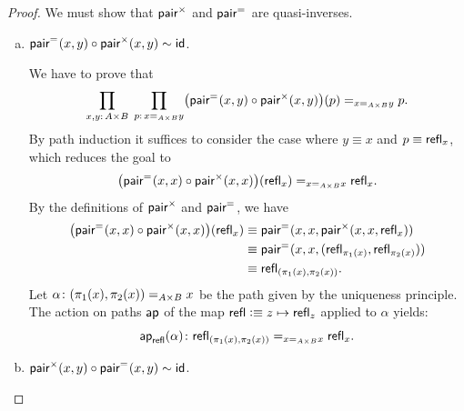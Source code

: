 \begin{proof}
    We must show that $\mathsf{pair}^\times$ and $\mathsf{pair}^{\mathrel{=_{}}}$ are quasi-inverses.
    \begin{enumerate}[a),font=\upshape]
        \item $\mathsf{pair}^{\mathrel{=_{}}}(x,y)\circ\mathsf{pair}^\times(x,y)\sim\mathsf{id}$.
         
        We have to prove that
        \[
            \prod_{x,y\colon A\times B}\;\prod_{p\colon x\eq{A\times B}y}
                \bigl(\fun{pair}^{\eq{}}(x,y)\circ\fun{pair}^\times(x,y)\bigr)(p)\eq{x\eq{A\times B}y}p.
        \]
        By path induction it suffices to consider the case where $y\equiv x$ and $p\equiv\mathsf{refl}_x$, which reduces the goal to
        \[
            \bigl(\mathsf{pair}^{\mathrel{=_{}}}(x,x)\circ\mathsf{pair}^\times(x,x)\bigr)(\mathsf{refl}_x)
                \mathrel{=_{x\mathrel{=_{A\times B}}x}}\mathsf{refl}_x.
        \]
        By the definitions of $\mathsf{pair}^\times$ and $\mathsf{pair}^{\mathrel{=_{}}}$, we have
        \begin{align*}
            \bigl(\mathsf{pair}^{\mathrel{=_{}}}(x,x)\circ\mathsf{pair}^\times(x,x)\bigr)(\mathsf{refl}_x)
                &\equiv\mathsf{pair}^{\mathrel{=_{}}}(x,x,\mathsf{pair}^\times(x,x,\mathsf{refl}_x))\\
                &\equiv\mathsf{pair}^{\mathrel{=_{}}}(x,x,
                    (\mathsf{refl}_{\pi_1(x)}
                    ,\mathsf{refl}_{\pi_2(x)}))\\
                &\equiv \mathsf{refl}_{(\pi_1(x),\pi_2(x))}.
        \end{align*}
        Let $\alpha\colon(\pi_1(x),\pi_2(x))\eq{A\times B}x$ be the path given by the uniqueness principle. The action on paths $\mathsf{ap}$ of the map $\mathsf{refl}\mathrel{\vcentcolon}\equiv z\mapsto\mathsf{refl}_z$ applied to $\alpha$ yields:
        \[
            \fun{ap}_{\fun{refl}}(\alpha)
                \colon\fun{refl}_{(\pi_1(x),\pi_2(x))}
                \eq{x\eq{A\times B}x}\fun{refl}_x.
        \]

        \item $\mathsf{pair}^\times(x,y)\circ\mathsf{pair}^{\mathrel{=_{}}}(x,y)\sim\mathsf{id}$.
        

\end{enumerate}
\end{proof}
